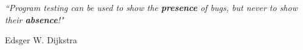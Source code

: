 \documentclass[11pt, oneside]{Thesis} %
\begin{document}
\pagestyle{empty} %

\null\vfill %



\textit{``Program testing can be used to show the \textbf{presence} of bugs, but never to show their \textbf{absence}!"}
\begin{flushright}
    Edsger W. Dijkstra
\end{flushright}

\vfill\vfill\vfill\vfill\vfill\vfill\null %

\clearpage %



\end{document}
